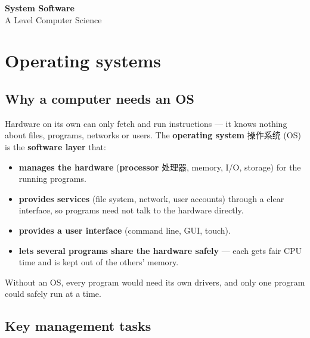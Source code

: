 \documentclass[11pt]{article}
\begin{document}
\begin{center}
  {\LARGE\bfseries System Software}\\[0.35em]
  {\large A Level Computer Science}
\end{center}
\vspace{0.6em}

\section*{Operating systems}

\subsection*{Why a computer needs an OS}

Hardware on its own can only fetch and run instructions — it knows nothing about files, programs, networks or users. The \textbf{operating system} 操作系统 (OS) is the \textbf{software layer} that:

\begin{itemize}
\item \textbf{manages the hardware} (\textbf{processor} 处理器, memory, I/O, storage) for the running programs.

\item \textbf{provides services} (file system, network, user accounts) through a clear interface, so programs need not talk to the hardware directly.

\item \textbf{provides a user interface} (command line, GUI, touch).

\item \textbf{lets several programs share the hardware safely} — each gets fair CPU time and is kept out of the others' memory.

\end{itemize}

Without an OS, every program would need its own drivers, and only one program could safely run at a time.

\subsection*{Key management tasks}
\end{document}
